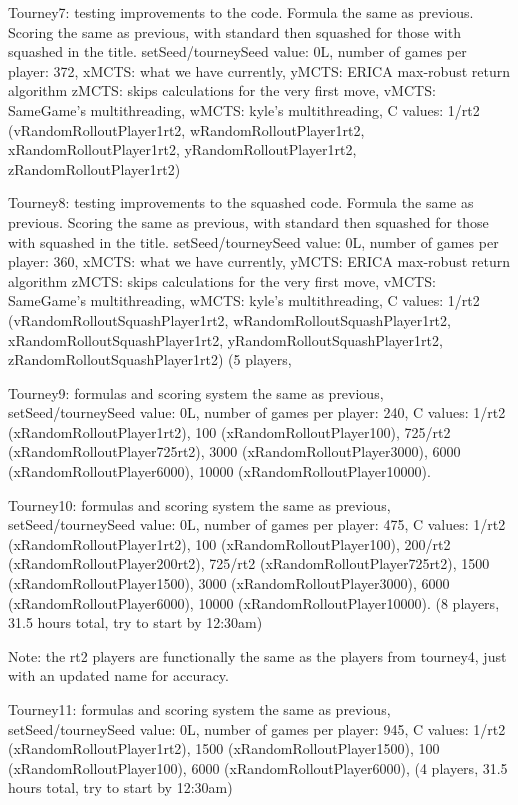 \documentclass[letterpaper]{article}
\begin{document}
Tourney7: testing improvements to the code. Formula the same as previous. Scoring the same as previous, with standard then squashed for those with squashed in the title. setSeed/tourneySeed value: 0L, number of games per player: 372,
	xMCTS: what we have currently,
	yMCTS: ERICA max-robust return algorithm
	zMCTS: skips calculations for the very first move,
	vMCTS: SameGame’s multithreading,
	wMCTS: kyle’s multithreading,
C values: 
1/rt2 (vRandomRolloutPlayer1rt2, wRandomRolloutPlayer1rt2, xRandomRolloutPlayer1rt2, yRandomRolloutPlayer1rt2, zRandomRolloutPlayer1rt2)

Tourney8: testing improvements to the squashed code. Formula the same as previous. Scoring the same as previous, with standard then squashed for those with squashed in the title. setSeed/tourneySeed value: 0L, number of games per player: 360,
	xMCTS: what we have currently,
	yMCTS: ERICA max-robust return algorithm
	zMCTS: skips calculations for the very first move,
	vMCTS: SameGame’s multithreading,
	wMCTS: kyle’s multithreading,
C values: 
1/rt2 (vRandomRolloutSquashPlayer1rt2, wRandomRolloutSquashPlayer1rt2, xRandomRolloutSquashPlayer1rt2, yRandomRolloutSquashPlayer1rt2, zRandomRolloutSquashPlayer1rt2) (5 players,

Tourney9: formulas and scoring system the same as previous, setSeed/tourneySeed value: 0L,  number of games per player: 240, C values:
1/rt2 (xRandomRolloutPlayer1rt2), 
100 (xRandomRolloutPlayer100),
725/rt2 (xRandomRolloutPlayer725rt2), 
3000 (xRandomRolloutPlayer3000), 
6000 (xRandomRolloutPlayer6000), 
10000 (xRandomRolloutPlayer10000).

Tourney10: formulas and scoring system the same as previous, setSeed/tourneySeed value: 0L,  number of games per player: 475, C values:
1/rt2 (xRandomRolloutPlayer1rt2), 
100 (xRandomRolloutPlayer100),
200/rt2 (xRandomRolloutPlayer200rt2), 
725/rt2 (xRandomRolloutPlayer725rt2), 
1500 (xRandomRolloutPlayer1500), 
3000 (xRandomRolloutPlayer3000), 
6000 (xRandomRolloutPlayer6000), 
10000 (xRandomRolloutPlayer10000).  (8 players, 31.5 hours total, try to start by 12:30am)

Note: the rt2 players are functionally the same as the players from tourney4, just with an updated name for accuracy.

Tourney11: formulas and scoring system the same as previous, setSeed/tourneySeed value: 0L,  number of games per player: 945, C values:
1/rt2 (xRandomRolloutPlayer1rt2), 
1500 (xRandomRolloutPlayer1500), 
100 (xRandomRolloutPlayer100),
6000 (xRandomRolloutPlayer6000), (4 players, 31.5 hours total, try to start by 12:30am)
\end{document}

